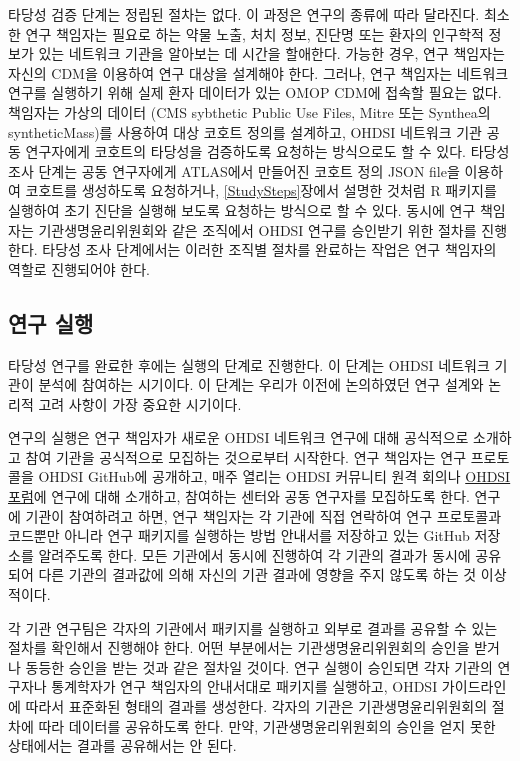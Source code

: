 \documentclass[10.5pt]{book}
\theoremstyle{definition}
\theoremstyle{definition}
\theoremstyle{definition}
\theoremstyle{remark}
\begin{document}
타당성 검증 단계는 정립된 절차는 없다. 이 과정은 연구의 종류에 따라
달라진다. 최소한 연구 책임자는 필요로 하는 약물 노출, 처치 정보, 진단명
또는 환자의 인구학적 정보가 있는 네트워크 기관을 알아보는 데 시간을
할애한다. 가능한 경우, 연구 책임자는 자신의 CDM을 이용하여 연구 대상을
설계해야 한다. 그러나, 연구 책임자는 네트워크 연구를 실행하기 위해 실제
환자 데이터가 있는 OMOP CDM에 접속할 필요는 없다. 책임자는 가상의 데이터
(CMS sybthetic Public Use Files, Mitre 또는 Synthea의 syntheticMass)를
사용하여 대상 코호트 정의를 설계하고, OHDSI 네트워크 기관 공동
연구자에게 코호트의 타당성을 검증하도록 요청하는 방식으로도 할 수 있다.
타당성 조사 단계는 공동 연구자에게 ATLAS에서 만들어진 코호트 정의 JSON
file을 이용하여 코호트를 생성하도록 요청하거나, \ref{StudySteps}장에서
설명한 것처럼 R 패키지를 실행하여 초기 진단을 실행해 보도록 요청하는
방식으로 할 수 있다. 동시에 연구 책임자는 기관생명윤리위원회와 같은
조직에서 OHDSI 연구를 승인받기 위한 절차를 진행한다. 타당성 조사
단계에서는 이러한 조직별 절차를 완료하는 작업은 연구 책임자의 역할로
진행되어야 한다.

\subsection{연구 실행}\label{--1}

타당성 연구를 완료한 후에는 실행의 단계로 진행한다. 이 단계는 OHDSI
네트워크 기관이 분석에 참여하는 시기이다. 이 단계는 우리가 이전에
논의하였던 연구 설계와 논리적 고려 사항이 가장 중요한 시기이다.

연구의 실행은 연구 책임자가 새로운 OHDSI 네트워크 연구에 대해 공식적으로
소개하고 참여 기관을 공식적으로 모집하는 것으로부터 시작한다. 연구
책임자는 연구 프로토콜을 OHDSI GitHub에 공개하고, 매주 열리는 OHDSI
커뮤니티 원격 회의나 \href{http://forums.ohdsi.org}{OHDSI 포럼}에 연구에
대해 소개하고, 참여하는 센터와 공동 연구자를 모집하도록 한다. 연구에
기관이 참여하려고 하면, 연구 책임자는 각 기관에 직접 연락하여 연구
프로토콜과 코드뿐만 아니라 연구 패키지를 실행하는 방법 안내서를 저장하고
있는 GitHub 저장소를 알려주도록 한다. 모든 기관에서 동시에 진행하여 각
기관의 결과가 동시에 공유되어 다른 기관의 결과값에 의해 자신의 기관
결과에 영향을 주지 않도록 하는 것 이상적이다.

각 기관 연구팀은 각자의 기관에서 패키지를 실행하고 외부로 결과를 공유할
수 있는 절차를 확인해서 진행해야 한다. 어떤 부분에서는
기관생명윤리위원회의 승인을 받거나 동등한 승인을 받는 것과 같은 절차일
것이다. 연구 실행이 승인되면 각자 기관의 연구자나 통계학자가 연구
책임자의 안내서대로 패키지를 실행하고, OHDSI 가이드라인에 따라서
표준화된 형태의 결과를 생성한다. 각자의 기관은 기관생명윤리위원회의
절차에 따라 데이터를 공유하도록 한다. 만약, 기관생명윤리위원회의 승인을
얻지 못한 상태에서는 결과를 공유해서는 안 된다.
\end{document}
